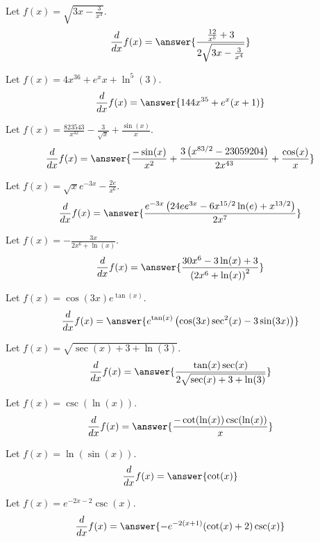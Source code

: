 \documentclass{ximera}
\begin{document}
\begin{shuffle}
\begin{exercise}
Let $f(x)=\sqrt{3 x-\frac{3}{x^4}}$.
\[
\ddx f(x) = \answer{\frac{\frac{12}{x^5}+3}{2 \sqrt{3 x-\frac{3}{x^4}}}}
\]
\end{exercise}

\begin{exercise}
Let $f(x)=4 x^{36}+e^x x+\ln ^5(3)$.
\[
\ddx f(x) = \answer{144 x^{35}+e^x (x+1)}
\]
\end{exercise}

\begin{exercise}
Let $f(x)=\frac{823543}{x^{42}}-\frac{3}{\sqrt{x}}+\frac{\sin (x)}{x}$.
\[
\ddx f(x) = \answer{\frac{-\sin (x)}{x^2}+\frac{3 \left(x^{83/2}-23059204\right)}{2 x^{43}}+\frac{\cos (x)}{x}}
\]
\end{exercise}

\begin{exercise}
Let $f(x)=\sqrt{x} e^{-3 x}-\frac{2 e}{x^6}$.
\[
\ddx f(x) = \answer{\frac{e^{-3 x} \left(24 e e^{3 x}-6 x^{15/2} \ln (e)+x^{13/2}\right)}{2 x^7}}
\]
\end{exercise}

\begin{exercise}
Let $f(x)=-\frac{3 x}{2 x^6+\ln (x)}$.
\[
\ddx f(x) = \answer{\frac{30 x^6-3 \ln (x)+3}{\left(2 x^6+\ln (x)\right)^2}}
\]
\end{exercise}

\begin{exercise}
Let $f(x)=\cos (3 x) e^{\tan (x)}$.
\[
\ddx f(x) = \answer{e^{\tan (x)} \left(\cos (3 x) \sec ^2(x)-3 \sin (3 x)\right)}
\]
\end{exercise}

\begin{exercise}
Let $f(x)=\sqrt{\sec (x)+3+\ln (3)}$.
\[
\ddx f(x) = \answer{\frac{\tan (x) \sec (x)}{2 \sqrt{\sec (x)+3+\ln (3)}}}
\]
\end{exercise}

\begin{exercise}
Let $f(x)=\csc (\ln (x))$.
\[
\ddx f(x) = \answer{\frac{-\cot (\ln (x)) \csc (\ln (x))}{x}}
\]
\end{exercise}

\begin{exercise}
Let $f(x)=\ln (\sin (x))$.
\[
\ddx f(x) = \answer{\cot (x)}
\]
\end{exercise}

\begin{exercise}
Let $f(x)=e^{-2 x-2} \csc (x)$.
\[
\ddx f(x) = \answer{-e^{-2 (x+1)} (\cot (x)+2) \csc (x)}
\]
\end{exercise}


\end{shuffle}
\end{document}
